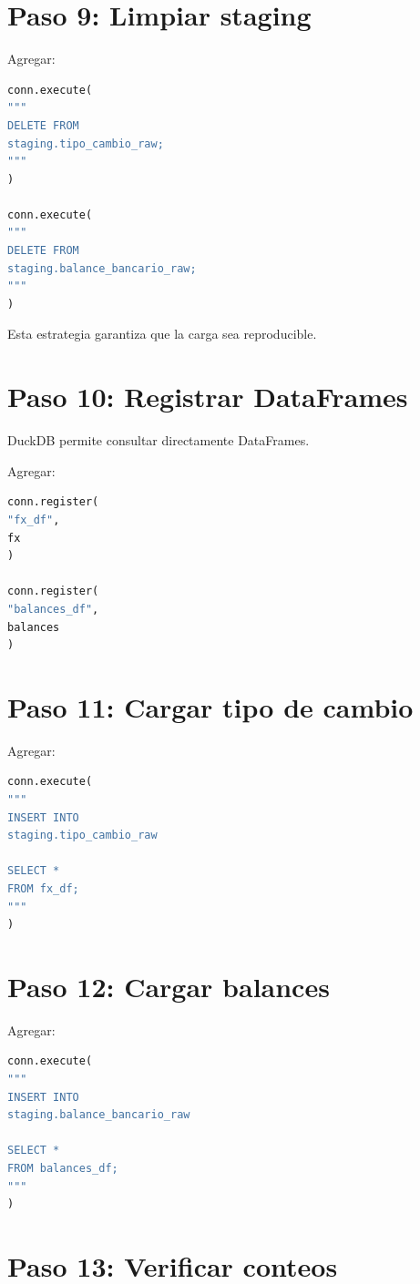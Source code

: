 \section{Paso 9: Limpiar staging}

Agregar:

\begin{lstlisting}[language=Python]
conn.execute(
"""
DELETE FROM
staging.tipo_cambio_raw;
"""
)

conn.execute(
"""
DELETE FROM
staging.balance_bancario_raw;
"""
)
\end{lstlisting}

Esta estrategia garantiza que la carga sea reproducible.

\section{Paso 10: Registrar DataFrames}

DuckDB permite consultar directamente DataFrames.

Agregar:

\begin{lstlisting}[language=Python]
conn.register(
"fx_df",
fx
)

conn.register(
"balances_df",
balances
)
\end{lstlisting}

\section{Paso 11: Cargar tipo de cambio}

Agregar:

\begin{lstlisting}[language=Python]
conn.execute(
"""
INSERT INTO
staging.tipo_cambio_raw

SELECT *
FROM fx_df;
"""
)
\end{lstlisting}

\section{Paso 12: Cargar balances}

Agregar:

\begin{lstlisting}[language=Python]
conn.execute(
"""
INSERT INTO
staging.balance_bancario_raw

SELECT *
FROM balances_df;
"""
)
\end{lstlisting}

\section{Paso 13: Verificar conteos}

